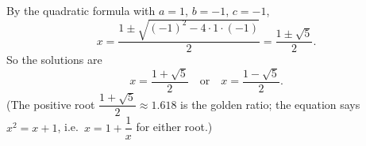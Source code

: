 By the quadratic formula with $a=1$, $b=-1$, $c=-1$,
\[
x=\dfrac{1\pm\sqrt{(-1)^2-4\cdot1\cdot(-1)}}{2}=\dfrac{1\pm\sqrt5}{2}.
\]
So the solutions are
\[
\boxed{x=\dfrac{1+\sqrt5}{2}\quad\text{or}\quad x=\dfrac{1-\sqrt5}{2}}.
\]
(The positive root $\dfrac{1+\sqrt5}{2}\approx1.618$ is the golden ratio; the equation says $x^2=x+1$, i.e.\ $x=1+\dfrac{1}{x}$ for either root.)

